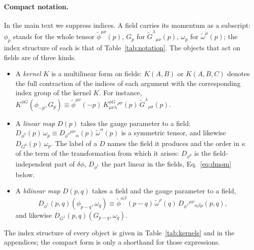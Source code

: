 \documentclass[prd,aps,preprint,superscriptaddress,nofootinbib,amsmath,amssymb,eqsecnum]{revtex4-2}
\newcommand{\tomega}{\tilde{\omega}}
\newcommand{\p}{\tilde{\phi}}
\newcommand{\G}{\tilde{G}}
\begin{document}
\paragraph{Compact notation.} In the main text we suppress indices. A field carries its
momentum as a subscript: $\phi_p$ stands for the whole tensor
$\p^{\mu\nu}(p)$, $G_p$ for $\G^{\lambda}{}_{\mu\nu}(p)$, $\omega_p$ for $\tomega^\mu(p)$;
the index structure of each is that of Table~\ref{tab:notation}. The objects that act on
fields are of three kinds.
\begin{itemize}
\item A \emph{kernel} $K$ is a multilinear form on fields: $K(A,B)$ or $K(A,B,C)$ denotes the
full contraction of the indices of each argument with the corresponding index group of the kernel $K$.
For instance,
$K^{\phi G}(\phi_{-p},G_p)\equiv\p^{\mu\nu}(-p)\,K^{\phi G}_{\mu\nu\lambda}{}^{\rho\sigma}(p)\,\G^{\lambda}{}_{\rho\sigma}(p)$.
\item A \emph{linear map} $D(p)$ takes the gauge parameter to a field:
$D_{\phi^0}(p)\,\omega_p\equiv D_{\phi^0}{}^{\mu\nu}{}_{\alpha}(p)\,\tomega^\alpha(p)$ is a
symmetric tensor, and likewise $D_{G^0}(p)\,\omega_p$. The label of a $D$ names the field it
produces and the order in $\kappa$ of the term of the transformation from which it arises:
$D_{\phi^0}$ is the field-independent part of $\delta\phi$, $D_{\phi^1}$ the part linear in
the fields, Eq.~\eqref{eq:dmom} below.
\item A \emph{bilinear map} $D(p,q)$ takes a field and the gauge parameter to a field,
\[
D_{\phi^1}(p,q)(\phi_{p-q},\omega_q)\equiv\p^{\alpha\beta}(p-q)\,\tomega^\rho(q)\,
D_{\phi^1}{}^{\mu\nu}{}_{\alpha\beta\rho}(p,q),
\]
and likewise $D_{G^1}(p,q)(G_{p-q},\omega_q)$.
\end{itemize}
The index structure of every object is given in Table~\ref{tab:kernels} and in the
appendices; the compact form is only a shorthand for those expressions.
\end{document}
